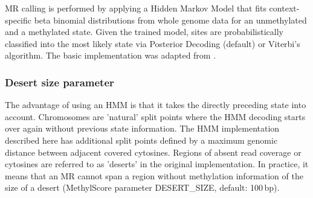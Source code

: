 \documentclass{article}
\begin{document}
MR calling is performed by applying a Hidden Markov Model that fits context-specific beta binomial distributions from whole genome data for an unmethylated and a methylated state. Given the trained model, sites are probabilistically classified into the most likely state via Posterior Decoding (default) or Viterbi's algorithm. The basic implementation was adapted from \cite{Molaro2011}.

\subsubsection*{Desert size parameter}
\label{desertsize}
The advantage of using an HMM is that it takes the directly preceding state into account. Chromosomes are 'natural' split points where the HMM decoding starts over again without previous state information. The HMM implementation described here has additional split points defined by a maximum genomic distance between adjacent covered cytosines. Regions of absent read coverage or cytosines are referred to as 'deserts' in the original implementation. In practice, it means that an MR cannot span a region without methylation information of the size of a desert (MethylScore parameter DESERT\_SIZE, default: 100\,bp).
\end{document}
